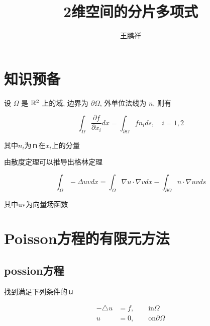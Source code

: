 \documentclass{article}
\begin{document}
\title{2维空间的分片多项式}
\author{王鹏祥}
\date{\chntoday}
\maketitle
\tableofcontents
\newpage

\section{知识预备}

\begin{theorem}
设 $\Omega$ 是 ${\mathbb R}^2$ 上的域, 边界为 $\partial\Omega$, 外单位法线为 $n$, 则有

\begin{equation}
\int_{\Omega} \frac{\partial f}{\partial x_{i}} d x=\int_{\partial \Omega} f n_{i} d s, \quad i=1,2
\end{equation}

其中$n_{i}$为ｎ在$x_i$上的分量
    
\end{theorem}

由散度定理可以推导出格林定理

\begin{theorem}

\begin{equation}
\int_{\Omega}-\Delta u v d x=\int_{\Omega} \nabla u \cdot \nabla v d x-\int_{\partial \Omega} n \cdot \nabla u v d s
\end{equation}
    
其中uv为向量场函数
\end{theorem}

\section{Poisson方程的有限元方法}

\subsection{possion方程}
找到满足下列条件的ｕ

\begin{equation}\label{1}
    \begin{alignat}{2}
        -\triangle u & =f,\qquad \text{in}\Omega \\
        u & =0, \qquad \text{on}\partial\Omega
    \end{alignat}
\end{equation}
\end{document}
